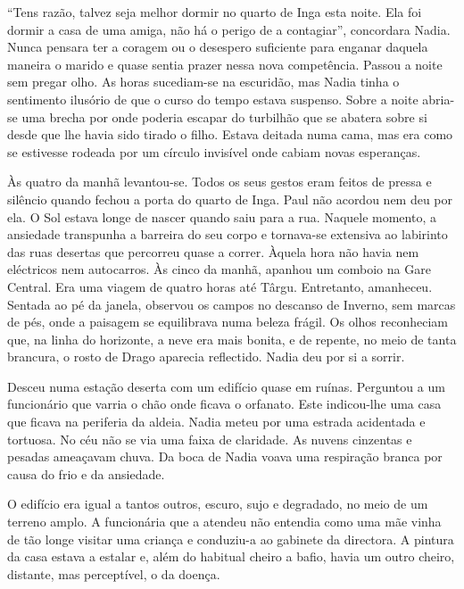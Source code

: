 ``Tens razão, talvez seja melhor dormir no quarto de Inga esta noite. Ela
foi dormir a casa de uma amiga, não há o perigo de a contagiar'',
concordara Nadia. Nunca pensara ter a coragem ou o desespero suficiente
para enganar daquela maneira o marido e quase sentia prazer nessa nova
competência. Passou a noite sem pregar olho. As horas sucediam-se na
escuridão, mas Nadia tinha o sentimento ilusório de que o curso do tempo
estava suspenso. Sobre a noite abria-se uma brecha por onde poderia
escapar do turbilhão que se abatera sobre si desde que lhe havia sido
tirado o filho. Estava deitada numa cama, mas era como se estivesse
rodeada por um círculo invisível onde cabiam novas esperanças.

Às quatro da manhã levantou-se. Todos os seus gestos eram feitos de
pressa e silêncio quando fechou a porta do quarto de Inga. Paul não
acordou nem deu por ela. O Sol estava longe de nascer quando saiu para a
rua. Naquele momento, a ansiedade transpunha a barreira do seu corpo e
tornava-se extensiva ao labirinto das ruas desertas que percorreu quase
a correr. Àquela hora não havia nem
eléctricos nem autocarros. Às cinco da manhã, apanhou um comboio na Gare
Central. Era uma viagem de quatro horas até Târgu. Entretanto,
amanheceu. Sentada ao pé da janela, observou os campos no descanso de
Inverno, sem marcas de pés, onde a paisagem se equilibrava numa beleza
frágil. Os olhos reconheciam que, na linha do horizonte, a neve era
mais bonita, e de repente, no meio de tanta brancura, o rosto de Drago
aparecia reflectido. Nadia deu por si a sorrir.

Desceu numa estação deserta com um edifício quase em ruínas. Perguntou a
um funcionário que varria o chão onde ficava o orfanato. Este
indicou-lhe uma casa que ficava na periferia da aldeia. Nadia meteu por
uma estrada acidentada e tortuosa. No céu não se via uma faixa de
claridade. As nuvens cinzentas e pesadas ameaçavam chuva. Da boca de
Nadia voava uma respiração branca por causa do frio e da ansiedade.

O edifício era igual a tantos outros, escuro, sujo e degradado, no
meio de um terreno amplo. A funcionária que a atendeu não entendia como
uma mãe vinha de tão longe visitar uma criança e conduziu-a ao gabinete
da directora. A pintura da casa estava a estalar e, além do habitual
cheiro a bafio, havia um outro cheiro, distante, mas perceptível, o da
doença.


